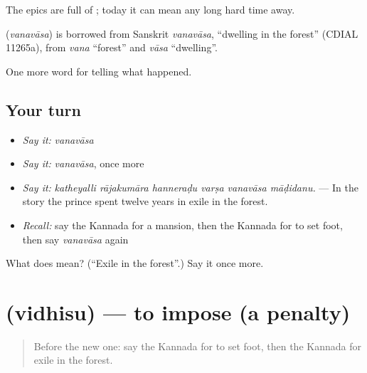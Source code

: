 The epics are full of ; today it can mean any long hard time away.

\begin{cousinweb}
\textbf{} (\emph{vanavāsa}) is borrowed from Sanskrit \emph{vanavāsa}, \textquotedblleft{}dwelling in the forest\textquotedblright{} (CDIAL 11265a), from \emph{vana} \textquotedblleft{}forest\textquotedblright{} and \emph{vāsa} \textquotedblleft{}dwelling\textquotedblright{}.
\end{cousinweb}

\begin{grammarlens}[title={What you've built}]
One more word for telling what happened.
\end{grammarlens}

\subsection*{Your turn}
\begin{itemize}
\raggedright
  \item \emph{Say it:} \emph{vanavāsa}
  \item \emph{Say it:} \emph{vanavāsa}, once more
  \item \emph{Say it:} \emph{katheyalli rājakumāra hanneraḍu varṣa vanavāsa māḍidanu.} — In the story the prince spent twelve years in exile in the forest.
  \item \emph{Recall:} say the Kannada for a mansion, then the Kannada for to set foot, then say \emph{vanavāsa} again
\end{itemize}

\begin{tcolorbox}[breakable,colback=teal!4,colframe=teal!35!black,title={Before you move on}]
What does  mean? (\textquotedblleft{}Exile in the forest\textquotedblright{}.) Say it once more.
\end{tcolorbox}
\section[\texorpdfstring{\kn{ವಿಧಿಸು} (vidhisu)}{ವಿಧಿಸು (vidhisu)}]{ (vidhisu) — to impose (a penalty)}

\label{lesson:KA-C372-vidhisu}



\begin{quote}
Before the new one: say the Kannada for to set foot, then the Kannada for exile in the forest.
\end{quote}

